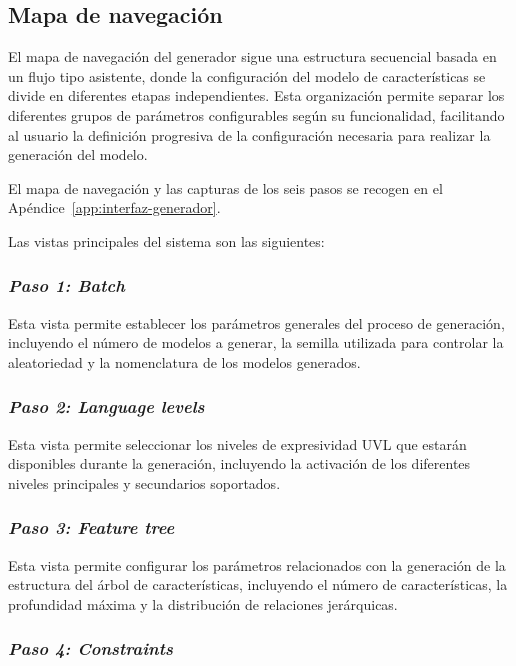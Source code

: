 \subsection{Mapa de navegación}
\label{subsec:mapa_navegacion}


El mapa de navegación del generador sigue una estructura secuencial basada en
un flujo tipo asistente, donde la configuración del modelo de
características se divide en diferentes etapas independientes. Esta organización
permite separar los diferentes grupos de parámetros configurables según su
funcionalidad, facilitando al usuario la definición progresiva de la
configuración necesaria para realizar la generación del modelo.

El mapa de navegación y las capturas de los seis pasos se recogen en el
Apéndice~\ref{app:interfaz-generador}.

Las vistas principales del sistema son las siguientes:


\subsubsection*{\textit{Paso 1: Batch}}

Esta vista permite establecer los parámetros generales del proceso de generación,
incluyendo el número de modelos a generar, la semilla utilizada para controlar
la aleatoriedad y la nomenclatura de los modelos generados.


\subsubsection*{\textit{Paso 2: Language levels}}

Esta vista permite seleccionar los niveles de expresividad UVL que estarán
disponibles durante la generación, incluyendo la activación de los diferentes
niveles principales y secundarios soportados.


\subsubsection*{\textit{Paso 3: Feature tree}}

Esta vista permite configurar los parámetros relacionados con la generación de la
estructura del árbol de características, incluyendo el número de características,
la profundidad máxima y la distribución de relaciones jerárquicas.


\subsubsection*{\textit{Paso 4: Constraints}}

